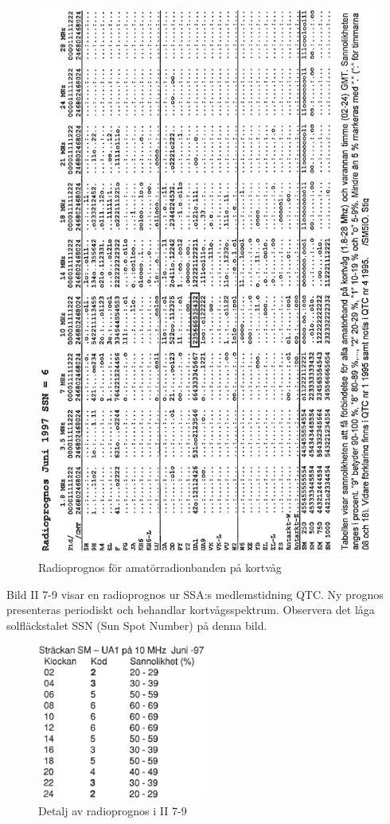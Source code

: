 \begin{figure}
  \includegraphics[width=\textwidth]{images/cropped_pdfs/bild_2_7-09.pdf}
  \caption{Radioprognos för amatörradionbanden på kortvåg}
  \label{fig:bildII7-9}
\end{figure}

Bild II 7-9 visar en radioprognos ur SSA:s medlemstidning QTC. Ny
prognos presenteras periodiskt och behandlar
kortvågsspektrum. Observera det låga solfläckstalet SSN (Sun Spot
Number) på denna bild.

\begin{figure}
  \includegraphics[width=0.5\textwidth]{images/cropped_pdfs/bild_2_7-10.pdf}
  \caption{Detalj av radioprognos i II 7-9}
  \label{fig:bildII7-10}
\end{figure}

